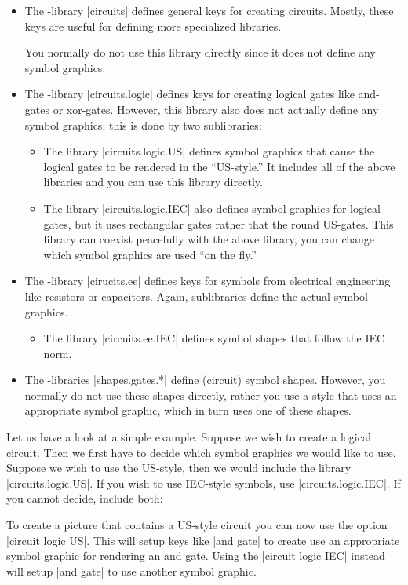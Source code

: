 \begin{itemize}
\item The \tikzname-library |circuits| defines general keys for
  creating circuits. Mostly, these keys are useful for defining more
  specialized libraries.

  You normally do not use this library directly since it does not
  define any symbol graphics.
\item The \tikzname-library |circuits.logic| defines keys for creating
  logical gates like and-gates or xor-gates. However, this library
  also does not actually define any symbol graphics; this is done by
  two sublibraries:
  \begin{itemize}
  \item The library |circuits.logic.US| defines symbol graphics that
    cause the logical gates to be rendered in the ``US-style.'' It
    includes all of the above libraries and you can use this library
    directly.
  \item The library |circuits.logic.IEC| also defines symbol graphics
    for logical gates, but it uses rectangular gates rather that the
    round US-gates. This library can coexist peacefully with the above
    library, you can change which symbol graphics are used ``on the
    fly.'' 
  \end{itemize}
\item The \tikzname-library |cirucits.ee| defines keys for symbols
  from electrical engineering like resistors or capacitors. Again,
  sublibraries define the actual symbol graphics.
  \begin{itemize}
  \item The library |circuits.ee.IEC| defines symbol shapes that
    follow the IEC norm.
  \end{itemize}
\item The \pgfname-libraries |shapes.gates.*| define (circuit) symbol
  shapes. However, you normally do not use these shapes directly,
  rather you use a style that uses an appropriate symbol graphic,
  which in turn uses one of these shapes.
\end{itemize}

Let us have a look at a simple example. Suppose we wish to create a
logical circuit. Then we first have to decide which symbol graphics we
would like to use. Suppose we wish to use the US-style, then we would
include the library |circuits.logic.US|. If you wish to use IEC-style
symbols, use |circuits.logic.IEC|. If you cannot decide, include both:
\begin{codeexample}
\usetikzlibrary{circuits.logic.US,circuits.logic.IEC}
\end{codeexample}
To create a picture that contains a US-style circuit you can now use
the option |circuit logic US|. This will setup keys like |and gate| to
create use an appropriate symbol graphic for rendering an and
gate. Using the |circuit logic IEC| instead will setup |and gate| to
use another symbol graphic.

